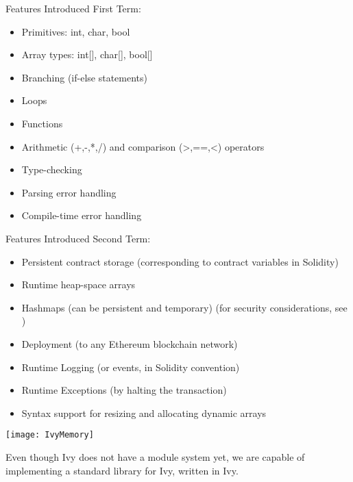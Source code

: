 \documentclass[landscape,a1paper,fontscale=0.485]{baposter} %
\begin{document}
\begin{poster}
{Features Introduced First Term:
\begin{itemize}
  \item Primitives: int, char, bool
  \item Array types: int[], char[], bool[]
  \item Branching (if-else statements)
  \item Loops
  \item Functions
  \item Arithmetic (+,-,*,/) and comparison (>,==,<) operators
  \item Type-checking
  \item Parsing error handling
  \item Compile-time error handling
\end{itemize}

Features Introduced Second Term:
\begin{itemize}
  \item Persistent contract storage (corresponding to contract variables in Solidity)
  \item Runtime heap-space arrays
  \item Hashmaps (can be persistent and temporary) (for security considerations, see \cite{solidity_hashmaps})
  \item Deployment (to any Ethereum blockchain network)
  \item Runtime Logging (or events, in Solidity convention)
  \item Runtime Exceptions (by halting the transaction)
  \item Syntax support for resizing and allocating dynamic arrays
\end{itemize}
\bigbreak
\begin{center}
\texttt{[image: IvyMemory]}
\end{center}
}

Even though Ivy does not have a module system yet, we are capable of implementing a standard library for Ivy, written in Ivy.

\end{poster}
\end{document}
